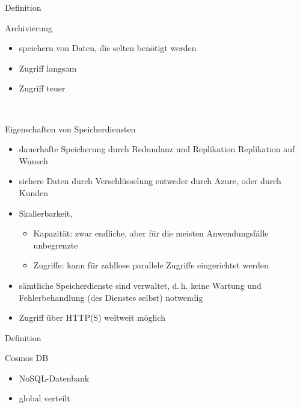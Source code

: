 \documentclass{scrartcl}
\newenvironment{flashcard}[2][]{%
    #1
    \vfill
    \centerline{\Large{#2}}
    \vfill
\newpage
}
{\newpage}
\begin{document}
    \begin{flashcard}[Definition]{Archivierung}
        \begin{itemize}
            \item speichern von Daten, die selten benötigt werden
            \item Zugriff langsam
            \item Zugriff teuer
        \end{itemize}
    \end{flashcard}

    \begin{flashcard}[\ ]{Eigenschaften von Speicherdiensten}
        \begin{itemize}
            \item dauerhafte Speicherung durch Redundanz und Replikation\newline
            Replikation auf Wunsch
            \item sichere Daten durch Verschlüsselung\newline
            entweder durch Azure, oder durch Kunden
            \item Skalierbarkeit,
            \begin{itemize}
                \item Kapazität: zwar endliche, aber für die meisten Anwendungsfälle unbegrenzte
                \item Zugriffe: kann für zahllose parallele Zugriffe eingerichtet werden
            \end{itemize}
            \item sämtliche Speicherdienste sind verwaltet, d.\,h. keine Wartung und Fehlerbehandlung (des Dienstes selbst) notwendig
            \item Zugriff über HTTP(S) weltweit möglich
        \end{itemize}
    \end{flashcard}

    \begin{flashcard}[Definition]{Cosmos DB}
        \begin{itemize}
            \item NoSQL-Datenbank
            \item global verteilt
        \end{itemize}
    \end{flashcard}
\end{document}
